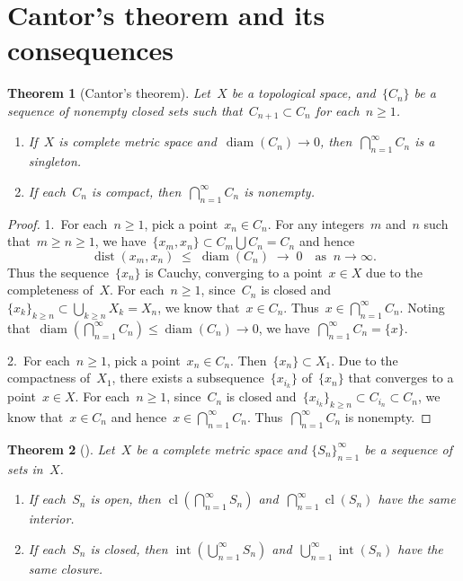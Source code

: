 \documentclass[11pt,a4paper]{article}  %
\newtheorem{theorem}{Theorem}[section]
\theoremstyle{definition}
\newcommand{\diam}{\operatorname{diam}}
\newcommand{\dist}{\operatorname{dist}}
\DeclareMathOperator{\inter}{int}
\DeclareMathOperator{\cl}{cl}
\numberwithin{equation}{section}
\begin{document}
\section{Cantor's theorem and its consequences}

\begin{theorem}[Cantor's theorem]
  \label{th:cantor}
  Let~$X$ be a topological space, and~$\{C_n\}$ be a sequence of
  nonempty closed sets such that~$C_{n+1}\subset C_n$ for each~$n\ge 1$.
\begin{enumerate}
  \item If~$X$ is complete metric space and~$\diam(C_n)\to 0$, then~$\bigcap_{n=1}^\infty C_n$ is
    a singleton.
  \item If each~$C_n$ is compact, then~$\bigcap_{n=1}^\infty C_n$ is nonempty.
\end{enumerate}
\end{theorem}

\begin{proof}
    1.~For each~$n\ge 1$, pick a point~$x_n\in C_n$. For any integers~$m$ and~$n$ such that~$m\ge
    n \ge 1$, we have~$\{x_m,x_n\}\subset C_m \bigcup C_n = C_n$ and hence
    \[
        \dist(x_m,x_n) \;\le\; \diam(C_n) \;\to\; 0 \quad \text{as }~ n\to\infty.
    \]
    Thus the sequence~$\{x_n\}$ is Cauchy, converging to a point~$x\in X$ due to the
    completeness of~$X$. For each~$n\ge 1$, since~$C_n$ is closed
    and~$\{x_k\}_{k\ge n}\subset \bigcup_{k\ge n} X_k = X_n$, we know
    that~$x\in C_n$. Thus~$x\in \bigcap_{n=1}^\infty C_n$. Noting that~$\diam(\bigcap_{n=1}
    ^\infty C_n) \le\diam(C_n) \to 0$, we have~$\bigcap_{n=1}^\infty C_n = \{x\}$.

    2.~For each~$n\ge 1$, pick a point~$x_n\in C_n$. Then~$\{x_n\} \subset X_1$. Due to the
    compactness of~$X_1$, there exists a subsequence~$\{x_{i_k}\}$ of~$\{x_n\}$ that converges to a
    point~$x\in X$. For each~$n\ge 1$, since~$C_n$ is closed and~$\{x_{i_k}\}_{k\ge n}\subset C_{i_n}
    \subset C_n$, we know that~$x\in C_n$ and hence~$x\in \bigcap_{n=1}^\infty C_n$.
    Thus~$\bigcap_{n=1}^\infty C_n$ is nonempty.
\end{proof}

\begin{theorem}[{\cite[Theorems~1.4.5--1.4.6]{Zalinescu_2002}}]
  \label{th:intclcm}
  Let~$X$ be a complete metric space and $\{S_n\}_{n=1}^\infty$ be a sequence of sets in~$X$.
  \begin{enumerate}
      \item\label{it:intcm} If each~$S_n$ is open, then $\cl(\bigcap_{n=1}^\infty S_n)$ and~$\bigcap_{n=1}^\infty \cl(S_n)$ have the same interior.
    \item If each~$S_n$ is closed, then $\inter(\bigcup_{n=1}^\infty S_n)$ and~$\bigcup_{n=1}^\infty \inter(S_n)$ have the same closure.
  \end{enumerate}
\end{theorem}
\end{document}
